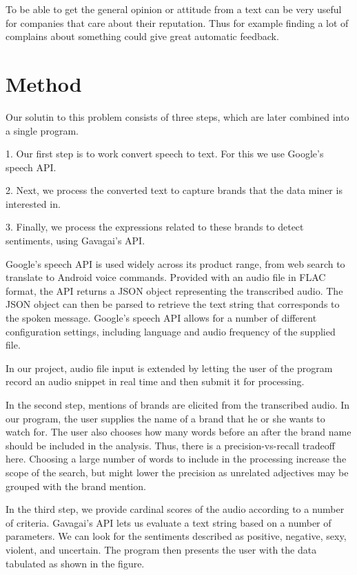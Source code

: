 \documentclass[a4paper,12pt,twoside]{ltxdoc}
\begin{document}
To be able to get the general opinion or attitude from a text can be very useful for companies that care about their reputation.
Thus for example finding a lot of complains about something could give great automatic feedback.


\section{Method}

Our solutin to this problem consists of three steps, which are later combined into a single program.

1. Our first step is to work convert speech to text. For this we use Google's speech API.

2. Next, we process the converted text to capture brands that the data miner is interested in.

3. Finally, we process the expressions related to these brands to detect sentiments, using Gavagai's API.

Google's speech API is used widely across its product range, from web search to translate to Android voice commands.
Provided with an audio file in FLAC format, the API returns a JSON object representing the transcribed audio. The JSON object
can then be parsed to retrieve the text string that corresponds to the spoken message. Google's speech API allows for a number
of different configuration settings, including language and audio frequency of the supplied file.

In our project, audio file input is extended by letting the user of the program record an audio snippet in real time and
then submit it for processing.

In the second step, mentions of brands are elicited from the transcribed audio. In our program, the user supplies the name
of a brand that he or she wants to watch for. The user also chooses how many words before an after the brand name should
be included in the analysis. Thus, there is a precision-vs-recall tradeoff here. Choosing a large number of words to include
in the processing increase the scope of the search, but might lower the precision as unrelated adjectives may be grouped
with the brand mention.

In the third step, we provide cardinal scores of the audio according to a number of criteria. Gavagai's API lets us
evaluate a text string based on a number of parameters. We can look for the sentiments described as positive, negative, sexy, violent,
and uncertain. The program then presents the user with the data tabulated as shown in the figure. %
\end{document}
